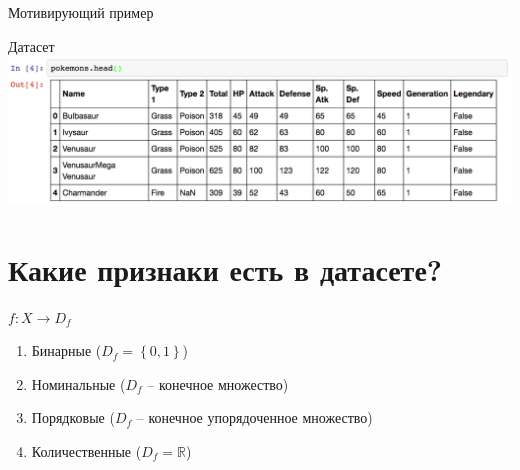 \documentclass[10pt]{beamer}
\begin{document}
{\begin{frame}{Мотивирующий пример}
\begin{figure}
	    \qquad 
	    \qquad
	    \qquad
	\end{figure}
\end{frame}
}

\begin{frame}{Датасет}
    \centering
	\includegraphics[width=\textwidth]{images/pokemons}
\end{frame}

\section{Какие признаки есть в датасете?}

\begin{frame}
	${f: X \rightarrow D_f}$
	\begin{enumerate} [-]
	  \item Бинарные (${D_f = \left\{ 0, 1 \right\} }$)
	  \item Номинальные (${D_f}$ -- конечное множество)
	  \item Порядковые (${D_f}$ -- конечное упорядоченное множество)
	  \item Количественные (${D_f = \mathbb{R} }$)
	\end{enumerate}
\end{frame}
\end{document}
